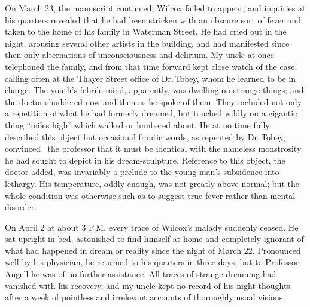 On March 23, the manuscript continued, Wilcox failed to appear; and
inquiries at his quarters revealed that he had been stricken with an
obscure sort of fever and taken to the home of his family in Waterman
Street. He had cried out in the night, arousing several other artists in
the building, and had manifested since then only alternations of
unconsciousness and delirium. My uncle at once telephoned the family,
and from that time forward kept close watch of the case; calling often
at the Thayer Street office of Dr.\,Tobey, whom he learned to be in
charge. The youth's febrile mind, apparently, was dwelling on strange
things; and the doctor shuddered now and then as he spoke of them. They
included not only a repetition of what he had formerly dreamed, but
touched wildly on a gigantic thing ``miles high'' which walked or
lumbered about.
He at no time fully described this object but occasional frantic words,
as repeated by Dr.\,Tobey, convinced \est\ the professor that it must be
identical with the nameless monstrosity he had sought to depict in his
dream-sculpture. Reference to this object, the doctor added, was
invariably a prelude to the young man's subsidence into lethargy. His
temperature, oddly enough, was not greatly above normal; but the whole
condition was otherwise such as to suggest true fever rather than mental
disorder.

On April 2 at about 3 P.M. every trace of Wilcox's malady suddenly
ceased. He sat upright in bed, astonished to find himself at home and
completely ignorant of what had happened in dream or reality since the
night of March 22. Pronounced well by his physician, he returned to his
quarters in three days; but to Professor Angell he was of no further
assistance. All traces of strange dreaming had vanished with his
recovery, and my uncle kept no record of his night-thoughts after a week
of pointless and irrelevant accounts of thoroughly usual visions.

